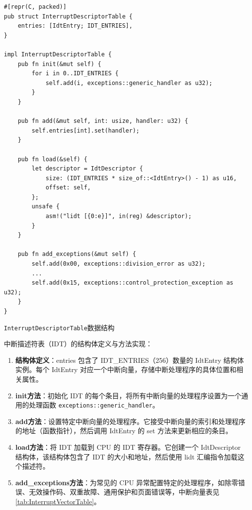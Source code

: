 \begin{listing}[htbp]
    \begin{verbatim}
#[repr(C, packed)]
pub struct InterruptDescriptorTable {
    entries: [IdtEntry; IDT_ENTRIES],
}

impl InterruptDescriptorTable {
    pub fn init(&mut self) {
        for i in 0..IDT_ENTRIES {
            self.add(i, exceptions::generic_handler as u32);
        }
    }

    pub fn add(&mut self, int: usize, handler: u32) {
        self.entries[int].set(handler);
    }

    pub fn load(&self) {
        let descriptor = IdtDescriptor {
            size: (IDT_ENTRIES * size_of::<IdtEntry>() - 1) as u16,
            offset: self,
        };
        unsafe {
            asm!("lidt [{0:e}]", in(reg) &descriptor);
        }
    }

    pub fn add_exceptions(&mut self) {
        self.add(0x00, exceptions::division_error as u32);
        ...
        self.add(0x15, exceptions::control_protection_exception as u32);
    }
}
    \end{verbatim}
    \caption{\texttt{InterruptDescriptorTable}数据结构}\label{lst:InterruptDescriptorTableDataStructure}
\end{listing}

中断描述符表（IDT）的结构体定义与方法实现：

\begin{enumerate}
    \item \textbf{结构体定义}：entries 包含了 IDT\_ENTRIES（256）数量的 IdtEntry 结构体实例。每个 IdtEntry 对应一个中断向量，存储中断处理程序的具体位置和相关属性。
    \item \textbf{init方法}：初始化 IDT 的每个条目，将所有中断向量的处理程序设置为一个通用的处理函数 \texttt{exceptions::generic\_handler}。
    \item \textbf{add方法}：设置特定中断向量的处理程序。它接受中断向量的索引和处理程序的地址（函数指针），然后调用 IdtEntry 的 set 方法来更新相应的条目。
    \item \textbf{load方法}：将 IDT 加载到 CPU 的 IDT 寄存器。它创建一个 IdtDescriptor 结构体，该结构体包含了 IDT 的大小和地址，然后使用 lidt 汇编指令加载这个描述符。
    \item \textbf{add\_exceptions方法}：为常见的 CPU 异常配置特定的处理程序，如除零错误、无效操作码、双重故障、通用保护和页面错误等，中断向量表见\cref{tab:InterruptVectorTable}。
\end{enumerate}


